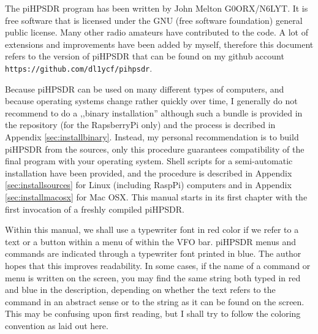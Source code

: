 \documentclass[12pt]{book}
\begin{document}
The piHPSDR program has been written by John Melton G0ORX/N6LYT. It is free software that is licensed under
the GNU (free software foundation) general public license. Many other radio amateurs have contributed to
the code. A lot of extensions and improvements have been added by myself, therefore this document refers
to the version of piHPSDR that can be found on my github account \texttt{https://github.com/dl1ycf/pihpsdr}.

Because piHPSDR can be used on many different types of computers, and because operating systems change
rather quickly over time, I generally do not recommend to do a ,,binary installation'' although such
a bundle is provided in the repository (for the RapsberryPi only) and the process is decribed in Appendix \ref{sec:installbinary}.
 Instead, my personal recommendation is to build piHPSDR
from the sources, only this procedure guarantees compatibility of the final program with your
operating system. Shell scripts for a semi-automatic installation have been provided,
and the procedure is described in Appendix \ref{sec:installsources} for Linux (including RaspPi)
computers and in Appendix \ref{sec:installmacosx} for Mac OSX.
This manual starts in its first chapter with the first invocation of a freshly compiled piHPSDR.

Within this manual, we shall use a typewriter font in red color if we refer to a text or a button within
a menu of within the VFO bar. piHPSDR menus and commands are indicated through a typewriter font
printed in blue. The author hopes that this improves readability. In some cases, if the name of a command
or  menu is written on the screen, you may find the same string both typed in red and blue in the
description, depending on whether the text refers to the command in an abstract sense or to the string as it
can be found on the screen. This may be confusing upon first reading, but I shall try to follow the coloring convention as laid out here.

\end{document}
